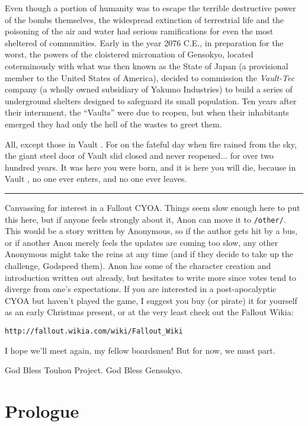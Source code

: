 \documentclass[a4paper,12pt]{book}
\newcommand{\maru}[1]{\raisebox{.5pt}{\textcircled{\raisebox{-.9pt} {#1}}}}
\newcommand{\vaultnine}{Vault \maru{9}}
\newcommand{\propername}[1]{\mbox{\emph{#1}}}
\newenvironment{commentary}%
	{
		\vfill%
		\hrule%
		\begin{footnotesize}%
		\color{MidnightBlue}%
	}%
	{%
		\end{footnotesize}%
	}
\begin{document}
Even though a portion of humanity was to escape the terrible destructive power of the bombs themselves, the widespread extinction of terrestrial life and the poisoning of the air and water had serious ramifications for even the most sheltered of communities. Early in the year 2076 C.E., in preparation for the worst, the powers of the cloistered micronation of Gensokyo, located coterminously with what was then known as the State of Japan (a provisional member to the United States of America), decided to commission the \propername{Vault-Tec} company (a wholly owned subsidiary of Yakumo Industries) to build a series of underground shelters designed to safeguard its small population. Ten years after their internment, the ``Vaults'' were due to reopen, but when their inhabitants emerged they had only the hell of the wastes to greet them.

All, except those in \vaultnine. For on the fateful day when fire rained from the sky, the giant steel door of \vaultnine{} slid closed and never reopened... for over two hundred years. It was here you were born, and it is here you will die, because in \vaultnine, no one ever enters, and no one ever leaves.


\begin{commentary}
Canvassing for interest in a Fallout CYOA. Things seem slow enough here to put this here, but if anyone feels strongly about it, Anon can move it to \verb|/other/|. This would be a story written by Anonymous, so if the author gets hit by a bus, or if another Anon merely feels the updates are coming too slow, any other Anonymous might take the reins at any time (and if they decide to take up the challenge, Godspeed them). Anon has some of the character creation and introduction written out already, but hesitates to write more since votes tend to diverge from one's expectations. If you are interested in a post-apocalyptic CYOA but haven't played the game, I suggest you buy (or pirate) it for yourself as an early Christmas present, or at the very least check out the Fallout Wikia:

\verb|http://fallout.wikia.com/wiki/Fallout_Wiki|

I hope we'll meet again, my fellow boardsmen! But for now, we must part.

God Bless Touhou Project. God Bless Gensokyo.
\end{commentary}




\chapter{Prologue}
\end{document}
